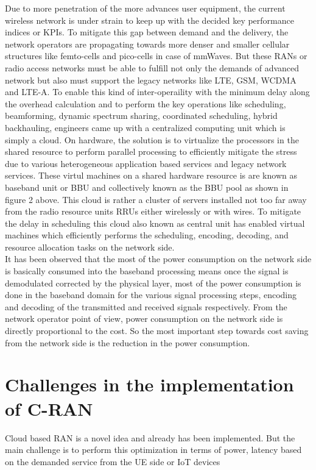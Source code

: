 Due to more penetration of the more advances user equipment, the current wireless network is under strain to keep up with the decided key performance indices or KPIs. To mitigate this gap between demand and the delivery, the network operators are propagating towards more denser and smaller cellular structures like femto-cells and pico-cells in case of mmWaves. But these RANs or radio access networks must be able to fulfill not only the demands of advanced network but also must support the legacy networks like LTE, GSM, WCDMA and LTE-A. To enable this kind of inter-operaility with the minimum delay along the overhead calculation and to perform the key operations like scheduling, beamforming, dynamic spectrum sharing, coordinated scheduling, hybrid backhauling, engineers came up with a centralized computing unit which is simply a cloud. On hardware, the solution is to virtualize the processors in the shared resource to perform parallel processing to efficiently mitigate the stress due to various heterogeneous application based services and legacy network services. These virtul machines on a shared hardware resource is are known as baseband unit or BBU and collectively known as the BBU pool as shown in figure 2 above.  This cloud is rather a cluster of servers installed not too far away from the radio resource units RRUs either wirelessly or with wires. To mitigate the delay in scheduling this cloud also known as central unit has enabled virtual machines which efficiently performs the scheduling, encoding, decoding, and resource allocation tasks on the network side. \\
It has been observed that the most of the power consumption on the network side is basically consumed into the baseband processing means once the signal is demodulated corrected by the physical layer, most of the power consumption is done in the baseband domain for the various signal processing steps, encoding and decoding of the transmitted and received signals respectively. From the network operator point of view, power consumption on the network side is directly proportional to the cost. So the most important step towards cost saving from the network side is the reduction in the power consumption.

\section{Challenges in the implementation of C-RAN} Cloud based RAN is a novel idea and already has been implemented. But the main challenge is to perform this optimization in terms of power, latency based on the demanded service from the UE side or IoT devices  